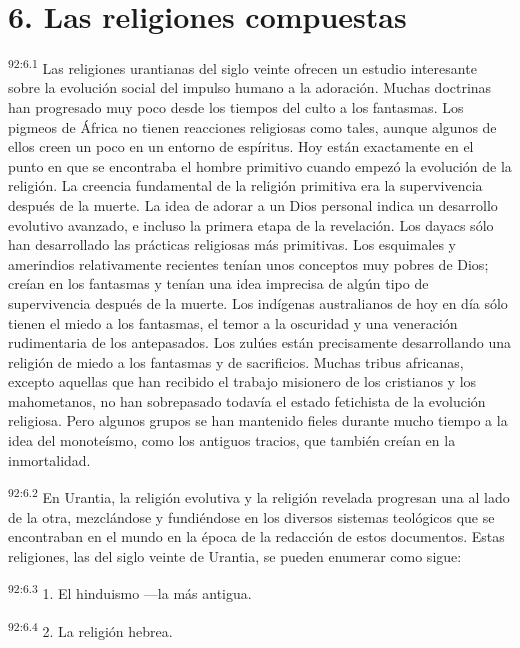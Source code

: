 \section*{6. Las religiones compuestas}
\par
\textsuperscript{92:6.1} Las religiones urantianas del siglo veinte ofrecen un estudio interesante sobre la evolución social del impulso humano a la adoración. Muchas doctrinas han progresado muy poco desde los tiempos del culto a los fantasmas. Los pigmeos de África no tienen reacciones religiosas como tales, aunque algunos de ellos creen un poco en un entorno de espíritus. Hoy están exactamente en el punto en que se encontraba el hombre primitivo cuando empezó la evolución de la religión. La creencia fundamental de la religión primitiva era la supervivencia después de la muerte. La idea de adorar a un Dios personal indica un desarrollo evolutivo avanzado, e incluso la primera etapa de la revelación. Los dayacs sólo han desarrollado las prácticas religiosas más primitivas. Los esquimales y amerindios relativamente recientes tenían unos conceptos muy pobres de Dios; creían en los fantasmas y tenían una idea imprecisa de algún tipo de supervivencia después de la muerte. Los indígenas australianos de hoy en día sólo tienen el miedo a los fantasmas, el temor a la oscuridad y una veneración rudimentaria de los antepasados. Los zulúes están precisamente desarrollando una religión de miedo a los fantasmas y de sacrificios. Muchas tribus africanas, excepto aquellas que han recibido el trabajo misionero de los cristianos y los mahometanos, no han sobrepasado todavía el estado fetichista de la evolución religiosa. Pero algunos grupos se han mantenido fieles durante mucho tiempo a la idea del monoteísmo, como los antiguos tracios, que también creían en la inmortalidad.

\par
\textsuperscript{92:6.2} En Urantia, la religión evolutiva y la religión revelada progresan una al lado de la otra, mezclándose y fundiéndose en los diversos sistemas teológicos que se encontraban en el mundo en la época de la redacción de estos documentos. Estas religiones, las del siglo veinte de Urantia, se pueden enumerar como sigue:

\par
\textsuperscript{92:6.3} 1. El hinduismo ---la más antigua.

\par
\textsuperscript{92:6.4} 2. La religión hebrea.


